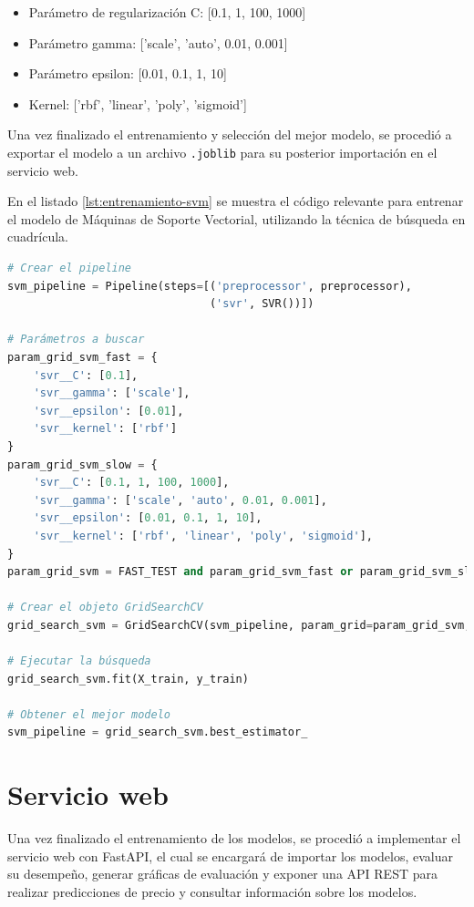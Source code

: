 \begin{itemize}
    \item Parámetro de regularización C: [0.1, 1, 100, 1000]
    \item Parámetro gamma: ['scale', 'auto', 0.01, 0.001]
    \item Parámetro epsilon: [0.01, 0.1, 1, 10]
    \item Kernel: ['rbf', 'linear', 'poly', 'sigmoid']
\end{itemize}

Una vez finalizado el entrenamiento y selección del mejor modelo, se procedió
a exportar el modelo a un archivo \texttt{.joblib} para su posterior importación en el
servicio web.

En el listado \ref{lst:entrenamiento-svm} se muestra el código relevante para
entrenar el modelo de Máquinas de Soporte Vectorial, utilizando la técnica de búsqueda
en cuadrícula.

\begin{lstlisting}[language=python, caption={Entrenamiento de Máquinas de Soporte Vectorial}, label={lst:entrenamiento-svm}]
# Crear el pipeline
svm_pipeline = Pipeline(steps=[('preprocessor', preprocessor),
                               ('svr', SVR())])

# Parámetros a buscar
param_grid_svm_fast = {
    'svr__C': [0.1],
    'svr__gamma': ['scale'],
    'svr__epsilon': [0.01],
    'svr__kernel': ['rbf']
}
param_grid_svm_slow = {
    'svr__C': [0.1, 1, 100, 1000],
    'svr__gamma': ['scale', 'auto', 0.01, 0.001],
    'svr__epsilon': [0.01, 0.1, 1, 10],
    'svr__kernel': ['rbf', 'linear', 'poly', 'sigmoid'],
}
param_grid_svm = FAST_TEST and param_grid_svm_fast or param_grid_svm_slow

# Crear el objeto GridSearchCV
grid_search_svm = GridSearchCV(svm_pipeline, param_grid=param_grid_svm, cv=5, verbose=2, n_jobs=-1)

# Ejecutar la búsqueda
grid_search_svm.fit(X_train, y_train)

# Obtener el mejor modelo
svm_pipeline = grid_search_svm.best_estimator_
\end{lstlisting}

\section{Servicio web}
Una vez finalizado el entrenamiento de los modelos, se procedió a implementar
el servicio web con FastAPI, el cual se encargará de importar los modelos, evaluar
su desempeño, generar gráficas de evaluación y exponer una API REST para realizar
predicciones de precio y consultar información sobre los modelos.

